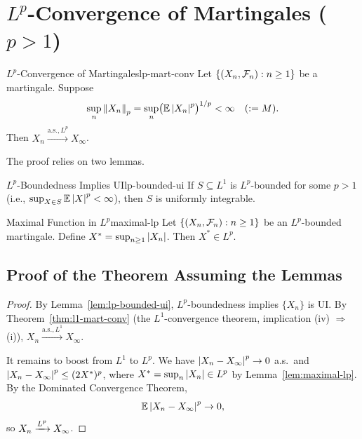 \section{\texorpdfstring{$L^p$}{Lp}-Convergence of Martingales (\texorpdfstring{$p > 1$}{p>1})}

\begin{theorem}{\texorpdfstring{$L^p$}{Lp}-Convergence of Martingales}{lp-mart-conv}
    Let $\{(X_n, \mathcal{F}_n) : n \geq 1\}$ be a martingale. Suppose
    \[
        \sup_n \left\|X_n\right\|_p = \sup_n \bigl(\mathbb{E}\left|X_n\right|^p\bigr)^{1/p} < \infty \quad (:= M).
    \]
    Then $X_n \xrightarrow{\text{a.s.}, L^p} X_\infty$.
\end{theorem}

The proof relies on two lemmas.

\begin{lemma}{\texorpdfstring{$L^p$}{Lp}-Boundedness Implies UI}{lp-bounded-ui}
    If $S \subseteq L^1$ is $L^p$-bounded for some $p > 1$ (i.e., $\sup_{X \in S} \mathbb{E}\left|X\right|^p < \infty$), then $S$ is uniformly integrable.
\end{lemma}

\begin{lemma}{Maximal Function in \texorpdfstring{$L^p$}{Lp}}{maximal-lp}
    Let $\{(X_n, \mathcal{F}_n) : n \geq 1\}$ be an $L^p$-bounded martingale. Define $X^* = \sup_{n \geq 1} \left|X_n\right|$. Then $X^* \in L^p$.
\end{lemma}

\subsection{Proof of the Theorem Assuming the Lemmas}

\begin{proof}
    By Lemma~\ref{lem:lp-bounded-ui}, $L^p$-boundedness implies $\{X_n\}$ is UI. By Theorem~\ref{thm:l1-mart-conv} (the $L^1$-convergence theorem, implication (iv) $\Rightarrow$ (i)), $X_n \xrightarrow{\text{a.s.}, L^1} X_\infty$.

    It remains to boost from $L^1$ to $L^p$. We have $\left|X_n - X_\infty\right|^p \to 0$ a.s.\ and $\left|X_n - X_\infty\right|^p \leq (2X^*)^p$, where $X^* = \sup_n \left|X_n\right| \in L^p$ by Lemma~\ref{lem:maximal-lp}. By the Dominated Convergence Theorem,
    \[
        \mathbb{E}\left|X_n - X_\infty\right|^p \to 0,
    \]
    so $X_n \xrightarrow{L^{p}} X_\infty$.
\end{proof}

